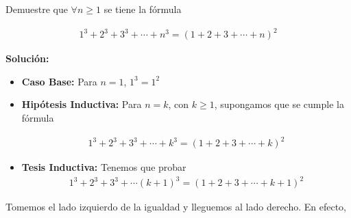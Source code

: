 \documentclass[12pt]{book}
\begin{document}
\begin{prob}{}{}
Demuestre que $\forall n \geq 1$ se tiene la fórmula

\begin{align*}
    1^3+2^3+3^3+\cdots+ n^3=(1+2+3+\cdots+n)^2
\end{align*}
\end{prob}
\textbf{Solución:}
\begin{itemize}
    \item \textbf{Caso Base:} Para $n=1$, $1^3=1^2$

    \item \textbf{Hipótesis Inductiva:} Para $n=k$, con $k\geq 1$, supongamos que se cumple la fórmula

\begin{align*}
    1^3+2^3+3^3+\cdots +k^3=(1+2+3+\cdots+k)^2
\end{align*}

\item \textbf{Tesis Inductiva:} Tenemos que probar
\begin{align*}
    1^3+2^3+3^3+\cdots (k+1)^3=(1+2+3+\cdots+k+1)^2
\end{align*}
\end{itemize}
Tomemos el lado izquierdo de la igualdad y lleguemos al lado derecho. En efecto,
\end{document}
